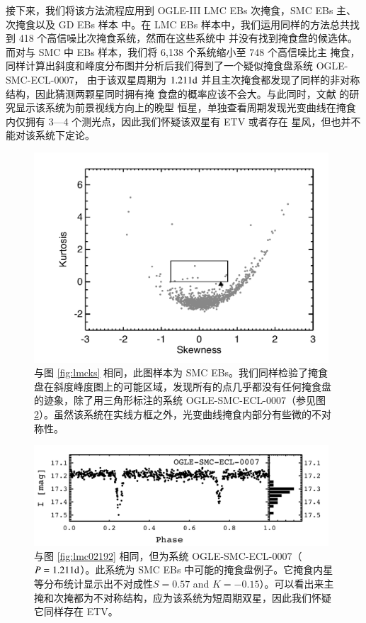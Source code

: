 接下来，我们将该方法流程应用到 OGLE-III LMC EBs 次掩食，SMC EBs 主、次掩食以及 GD EBs 样本
中。在 LMC EBs 样本中，我们运用同样的方法总共找到 418 个高信噪比次掩食系统，然而在这些系统中
并没有找到掩食盘的候选体。而对与 SMC 中 EBs 样本，我们将 6,138 个系统缩小至 748 个高信噪比主
掩食，同样计算出斜度和峰度分布图并分析后我们得到了一个疑似掩食盘系统 OGLE- SMC-ECL-0007，
由于该双星周期为 $1.211 \mathrm{d}$ 并且主次掩食都发现了同样的非对称结构，因此猜测两颗星同时拥有掩
食盘的概率应该不会大。与此同时，文献  的研究显示该系统为前景视线方向上的晚型
恒星，单独查看周期发现光变曲线在掩食内仅拥有 3---4 个测光点，因此我们怀疑该双星有 ETV 或者存在
星风，但也并不能对该系统下定论。

\begin{figure}[t]
\centering
\includegraphics[width=0.98\textwidth,trim={0.4in 0.2in 0 0}]{figures/chapter3/f11_smcks.pdf}
\caption{与图 \ref{fig:lmcks} 相同，此图样本为 SMC EBs。我们同样检验了掩食盘在斜度峰度图上的可能区域，发现所有的点几乎都没有任何掩食盘的迹象，除了用三角形标注的系统 OGLE-SMC-ECL-0007（参见图 \ref{fig:smc0007}）。虽然该系统在实线方框之外，光变曲线掩食内部分有些微的不对称性。}
\label{fig:smcks}
\end{figure}


\begin{figure}[t]
\centering
\includegraphics[width=0.98\textwidth,trim={0.0in 0.2in 0 0}]{figures/chapter3/f12_smc0007.pdf}
\caption{与图 \ref{fig:lmc02192} 相同，但为系统 OGLE-SMC-ECL-0007（$P = 1.211 \mathrm{d}$）。此系统为 SMC EBs 中可能的掩食盘例子。它掩食内星等分布统计显示出不对成性$S=0.57$ and $K=-0.15$）。可以看出来主掩和次掩都为不对称结构，应为该系统为短周期双星，因此我们怀疑它同样存在 ETV。}
\label{fig:smc0007}
\end{figure}

